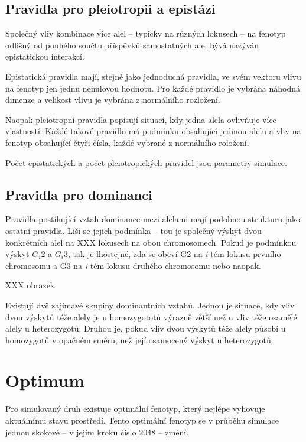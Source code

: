 \subsection{Pravidla pro pleiotropii a epistázi}

Společný vliv kombinace více alel -- typicky na různých lokusech -- na fenotyp odlišný od pouhého součtu příspěvků samostatných alel bývá nazýván epistatickou interakcí.

Epistatická pravidla mají, stejně jako jednoduchá pravidla, ve svém vektoru vlivu na fenotyp jen jednu nenulovou hodnotu. Pro každé pravidlo je vybrána náhodná dimenze a velikost vlivu je vybrána z normálního rozložení.

Naopak pleiotropní pravidla popisují situaci, kdy jedna alela ovlivňuje více vlastností. Každé takové pravidlo má podmínku obsahující jedinou alelu a vliv na fenotyp obsahující čtyři čísla, každé vybrané z normálního roložení.

Počet epistatických a počet pleiotropických pravidel jsou parametry simulace.

\subsection{Pravidla pro dominanci}

Pravidla postihující vztah dominance mezi alelami mají podobnou strukturu jako ostatní pravidla. Liší se jejich podmínka -- tou je společný výskyt dvou konkrétních alel na XXX lokusech na obou chromosomech. Pokud je podmínkou výskyt $G_i{2}$ a $G_i{3}$, tak je lhostejné, zda se obeví G2 na \textit{i}-tém lokusu prvního chromosomu a G3 na \textit{i}-tém lokusu druhého chromosomu nebo naopak.

XXX obrazek

Existují dvě zajímavé skupiny dominantních vztahů. Jednou je situace, kdy vliv dvou výskytů téže alely je u homozygototů výrazně větší než u vliv téže osamělé alely u heterozygotů. Druhou je, pokud vliv dvou výskytů téže alely působí u homozygotů v opačném směru, než její osamocený výskyt u heterozygotů.



\section{Optimum}

Pro simulovaný druh existuje optimální fenotyp, který nejlépe vyhovuje aktuálnímu stavu prostředí. Tento optimální fenotyp se v průběhu simulace jednou skokově -- v jejím kroku číslo 2048 -- změní.

